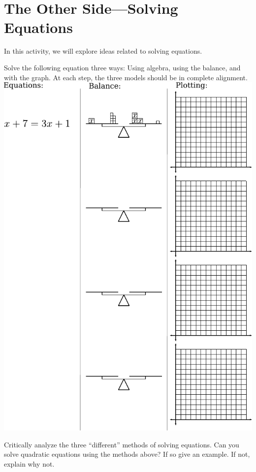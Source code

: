 \newpage
\section{The Other Side---Solving Equations}\label{A:otherSide}


In this activity, we will explore ideas related to solving equations.

\begin{prob}
Solve the following equation three ways: Using algebra, using the
balance, and with the graph. At each step, the three models should be in
complete alignment.
\[
\]\includegraphics[scale=0.8]{../graphics/eqBalGraph.pdf}

\end{prob}

\begin{prob}
Critically analyze the three ``different'' methods of solving
equations. Can you solve quadratic equations using the methods above?
If so give an example. If not, explain why not.
\end{prob}

